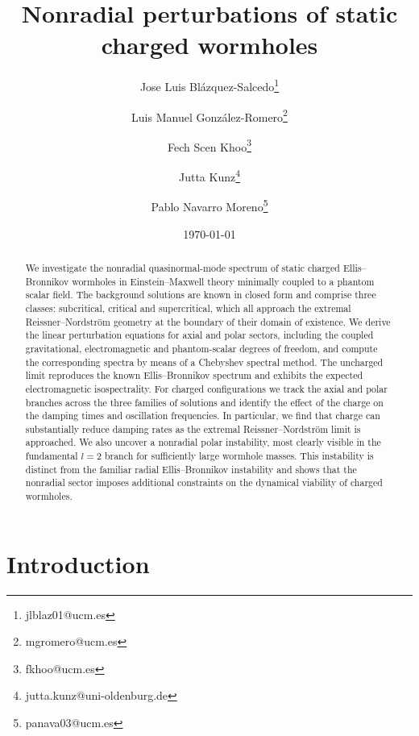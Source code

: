 \documentclass[11pt,a4paper]{article}
\title{Nonradial perturbations of static charged wormholes}
\begin{document}
 

\author[1]{Jose Luis Blázquez-Salcedo\thanks{jlblaz01@ucm.es}}
\author[1]{Luis Manuel González-Romero\thanks{mgromero@ucm.es}}
\author[1]{Fech Scen Khoo\thanks{fkhoo@ucm.es}}
\author[2]{Jutta Kunz\thanks{jutta.kunz@uni-oldenburg.de}}
\author[1]{Pablo Navarro Moreno\thanks{panava03@ucm.es}}


\date{\today}


\maketitle


\begin{abstract}
We investigate the nonradial quasinormal-mode spectrum of static charged Ellis--Bronnikov wormholes in Einstein--Maxwell theory minimally coupled to a phantom scalar field. 
The background solutions are known in closed form and comprise three classes: subcritical, critical and supercritical, which all approach the extremal Reissner--Nordstr\"om geometry at the boundary of their domain of existence. 
We derive the linear perturbation equations for axial and polar sectors, including the coupled gravitational, electromagnetic and phantom-scalar degrees of freedom, and compute the corresponding spectra by means of a Chebyshev spectral method. 
The uncharged limit reproduces the known Ellis--Bronnikov spectrum and exhibits the expected electromagnetic isospectrality. 
For charged configurations we track the axial and polar branches across the three families of solutions and identify the effect of the charge on the damping times and oscillation frequencies. 
In particular, we find that charge can substantially reduce damping rates as the extremal Reissner--Nordstr\"om limit is approached. 
We also uncover a nonradial polar instability, most clearly visible in the fundamental $l=2$ branch for sufficiently large wormhole masses. 
This instability is distinct from the familiar radial Ellis--Bronnikov instability and shows that the nonradial sector imposes additional constraints on the dynamical viability of charged wormholes.
\end{abstract}


\section{Introduction}
\label{sec:Introduction}
\end{document}
